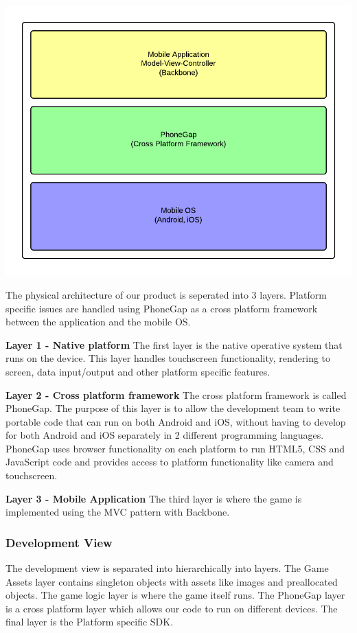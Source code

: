 \includegraphics[width=\textwidth]{pictures/physical_view}

The physical architecture of our product is seperated into 3 layers. Platform specific issues are handled using PhoneGap as a cross platform framework between the application and the mobile OS.

{\bf Layer 1 - Native platform}
The first layer is the native operative system that runs on the device. This layer handles touchscreen functionality, rendering to screen, data input/output and other platform specific features.

{\bf Layer 2 - Cross platform framework}
The cross platform framework is called PhoneGap. The purpose of this layer is to allow the development team to write portable code that can run on both Android and iOS, without having to develop for both Android and iOS separately in 2 different programming languages. PhoneGap uses browser functionality on each platform to run HTML5, CSS and JavaScript code and provides access to platform functionality like camera and touchscreen.

{\bf Layer 3 - Mobile Application}
The third layer is where the game is implemented using the MVC pattern with Backbone. 


\subsubsection{Development View} %
The development view is separated into hierarchically into layers. The Game Assets layer contains singleton objects with assets like images and preallocated objects. The game logic layer is where the game itself runs. The PhoneGap layer is a cross platform layer which allows our code to run on different devices. The final layer is the Platform specific SDK.

